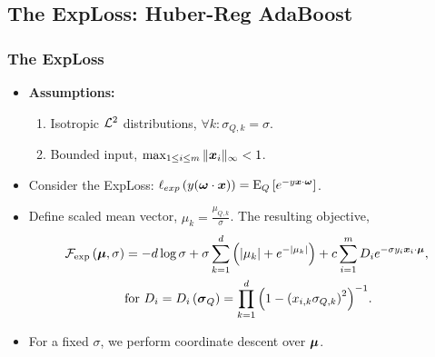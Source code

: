 \documentclass[mathserif]{beamer}
\begin{document}
\subsection{The ExpLoss: Huber-Reg AdaBoost}
\begin{frame}
\frametitle{ The ExpLoss  }
\begin{itemize}
\item \textbf{Assumptions:}
\begin{enumerate}
\item Isotropic ${\mathcal{L}}^2$ distributions, $\forall k:\sigma_{Q,k}=\sigma$.
\item Bounded input, $\max_{1\leq i\leq m}\Vert {\boldsymbol{x}}_{i} \Vert_\infty < 1$.
 \end{enumerate}
\item Consider the ExpLoss: $\ell_{exp}\left({y ({\boldsymbol{\omega}} \cdot {\boldsymbol{x}})}\right) = {\rm E}_{Q}\left[{e^{- y  {\boldsymbol{x}} \cdot{\boldsymbol{\omega}}} }\right]$.
\item Define scaled mean vector, $\mu_k=\frac{\mu_{Q,k}}{\sigma}$. The resulting objective,
\begin{align*}
{\mathcal{F}}_{\exp} \left({{\boldsymbol{\mu}},\sigma}\right)&=-d\log\sigma+
\sigma\sum_{k=1}^{d} \left({\left\vert{\mu_{k} }\right\vert+e^{-\left\vert{\mu_{k} }\right\vert } }\right)+ c\sum_{i =1}^m D_i e^{-\sigma y_{i}  {\boldsymbol{x}}_{i} \cdot {\boldsymbol{\mu}}},\\
&\textrm{for } D_i = D_i\left({{\boldsymbol{\sigma}}_{Q}}\right)= \prod_{k=1}^d {\left({1-\left({x_{i,k}\sigma_{Q,k}}\right)^2}\right)}^{-1}.
\end{align*}
\item For a fixed $\sigma$, we perform coordinate descent over ${\boldsymbol{\mu}}$.
\end{itemize}
\end{frame}
\end{document}
